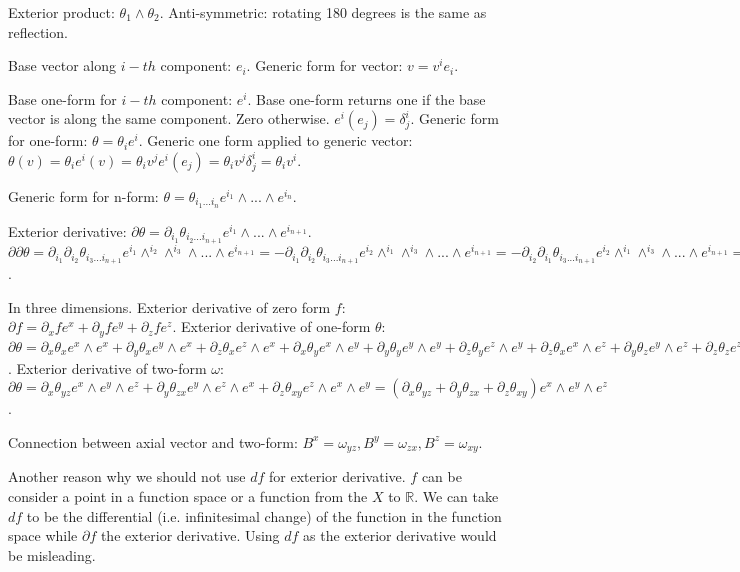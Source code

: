 \documentclass[11pt,letterpaper,fleqn]{memoir} %
\begin{document}
Exterior product: $\theta_1 \wedge \theta_2$. Anti-symmetric: rotating 180 degrees is the same as reflection.

Base vector along $i-th$ component: $e_i$. Generic form for vector: $v = v^i e_i$.

Base one-form for $i-th$ component: $e^i$. Base one-form returns one if the base vector is along the same component. Zero otherwise. $e^i(e_j) = \delta^i_j$.  Generic form for one-form: $\theta = \theta_i e^i$. Generic one form applied to generic vector: $\theta(v) = \theta_i e^i(v) = \theta_i v^j e^i(e_j) = \theta_i v^j \delta^i_j = \theta_i v^i$.

Generic form for n-form: $\theta = \theta_{i_1...i_n}e^{i_1}\wedge ... \wedge e^{i_n}$.

Exterior derivative: $\partial \theta = \partial_{i_1} \theta_{i_2...i_{n+1}}e^{i_1}\wedge ... \wedge e^{i_{n+1}}$. $\partial \partial \theta = \partial_{i_1} \partial_{i_2} \theta_{i_3...i_{n+1}}e^{i_1}\wedge^{i_2}\wedge^{i_3}\wedge ... \wedge e^{i_{n+1}} = - \partial_{i_1} \partial_{i_2} \theta_{i_3...i_{n+1}}e^{i_2}\wedge^{i_1}\wedge^{i_3}\wedge ... \wedge e^{i_{n+1}} = - \partial_{i_2} \partial_{i_1} \theta_{i_3...i_{n+1}}e^{i_2}\wedge^{i_1}\wedge^{i_3}\wedge ... \wedge e^{i_{n+1}} = 0$.

In three dimensions. Exterior derivative of zero form $f$: $\partial f = \partial_x f e^x + \partial_y f e^y + \partial_z f e^z$. Exterior derivative of one-form $\theta$: $\partial \theta = \partial_x \theta_x e^x \wedge e^x + \partial_y \theta_x e^y \wedge e^x + \partial_z \theta_x e^z \wedge e^x + \partial_x \theta_y e^x \wedge e^y + \partial_y \theta_y e^y \wedge e^y + \partial_z \theta_y e^z \wedge e^y + \partial_z \theta_x e^x \wedge e^z + \partial_y \theta_z e^y \wedge e^z + \partial_z \theta_z e^z \wedge e^z = (\partial_x \theta_y - \partial_y \theta_x) e^x \wedge e^y + (\partial_y \theta_z - \partial_z \theta_y) e^y \wedge e^z + (\partial_z \theta_x - \partial_x \theta_z) e^z \wedge e^x$. Exterior derivative of two-form $\omega$: $\partial \theta = \partial_x \theta_{yz} e^x \wedge e^y \wedge e^z + \partial_y \theta_{zx} e^y \wedge e^z \wedge e^x + \partial_z \theta_{xy} e^z \wedge e^x \wedge e^y = (\partial_x \theta_{yz} + \partial_y \theta_{zx} + \partial_z \theta_{xy}) e^x \wedge e^y \wedge e^z$.

Connection between axial vector and two-form: $B^x = \omega_{yz}, B^y = \omega_{zx}, B^z = \omega_{xy}$.

Another reason why we should not use $df$ for exterior derivative. $f$ can be consider a point in a function space or a function from the $X$ to $\mathbb{R}$. We can take $df$ to be the differential (i.e. infinitesimal change) of the function in the function space while $\partial f$ the exterior derivative. Using $df$ as the exterior derivative would be misleading.
\end{document}
